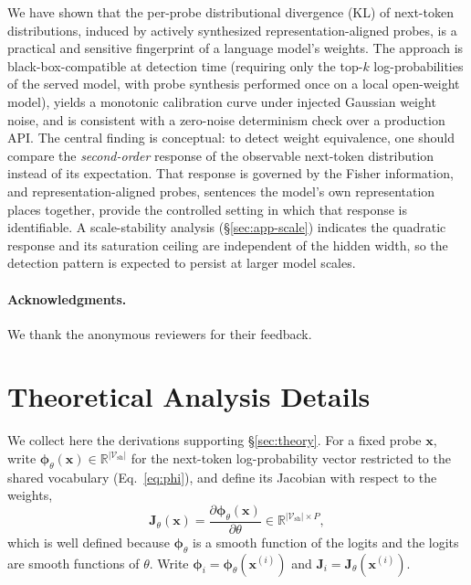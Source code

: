 \documentclass[11pt]{article}
\newcommand{\R}{\mathbb{R}}
\newcommand{\Vsh}{\mathcal{V}_{\mathrm{sh}}}
\theoremstyle{definition}
\begin{document}
We have shown that the per-probe distributional divergence (KL) of next-token
distributions, induced by actively synthesized representation-aligned
probes, is a practical and sensitive fingerprint of a language model's weights.
The approach is black-box-compatible at detection time (requiring only the
top-$k$ log-probabilities of the served model, with probe synthesis performed
once on a local open-weight model), yields a monotonic calibration curve under
injected Gaussian weight noise, and is consistent with a zero-noise determinism
check over a production API. The central finding is conceptual: to detect weight equivalence, one
should compare the \emph{second-order} response of the observable next-token
distribution instead of its expectation. That response is governed by the Fisher
information, and representation-aligned probes, sentences the model's own
representation places together, provide the controlled setting in which that
response is identifiable. A scale-stability analysis (\S\ref{sec:app-scale})
indicates the quadratic response and its saturation ceiling are independent of
the hidden width, so the detection pattern is expected to persist at larger
model scales.

\paragraph{Acknowledgments.} We thank the anonymous reviewers for their
feedback.



\appendix
\section{Theoretical Analysis Details}
\label{sec:theory-app}

We collect here the derivations supporting \S\ref{sec:theory}. For a fixed
probe $\bm{x}$, write $\bm{\phi}_\theta(\bm{x}) \in \R^{|\Vsh|}$ for the
next-token log-probability vector restricted to the shared vocabulary
(Eq.~\eqref{eq:phi}), and define its Jacobian with respect to the weights,
\begin{equation}
  \bm{J}_\theta(\bm{x}) = \frac{\partial \bm{\phi}_\theta(\bm{x})}{\partial \theta}
    \in \R^{|\Vsh| \times P},
  \label{eq:jacobian}
\end{equation}
which is well defined because $\bm{\phi}_\theta$ is a smooth function of the
logits and the logits are smooth functions of $\theta$. Write
$\bm{\phi}_i = \bm{\phi}_\theta(\bm{x}^{(i)})$ and
$\bm{J}_i = \bm{J}_\theta(\bm{x}^{(i)})$.
\end{document}
